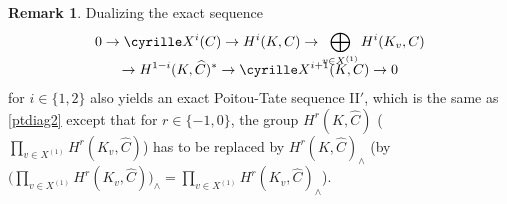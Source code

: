 \documentclass[JEP,XML,SOM,Unicode, NoEqCountersInSection]{cedram}
\newcommand{\tprod}{{\textstyle\prod}}
\theoremstyle{plain}
\theoremstyle{definition}
\newtheorem{rema}[theo]{Remark}
\newcommand\Sha{\cyrille X}
\begin{document}
\begin{rema} \label{II'}
Dualizing the exact sequence
\begin{multline*}
0 \to \Sha^i(C) \to H^i(K,C) \to
\bigoplus_{v \in X^{(1)}} H^i(K_v,C)\\[-8pt]
\to H^{1-i}(K,\widehat C)^*
\to \Sha^{i+1}(K,C) \to 0
\end{multline*}
for $i \in \{1, 2\}$ also yields an exact Poitou-Tate sequence II$'$, which
is the same as \eqref{ptdiag2} except that for $r \in \{-1, 0\}$, the
group $H^r(K,\widehat C)$ (\resp $\tprod_{v \in X^{(1)}} H^r(K_v,\widehat C)$)
has to be replaced
by $H^r(K,\widehat C)_{\wedge}$ (\resp by $\bigl(\tprod_{v \in X^{(1)}} H^r(K_v,\widehat C)\bigr)_{\wedge}=
\tprod_{v \in X^{(1)}} H^r(K_v,\widehat C)_{\wedge}$).
\end{rema}
\end{document}
